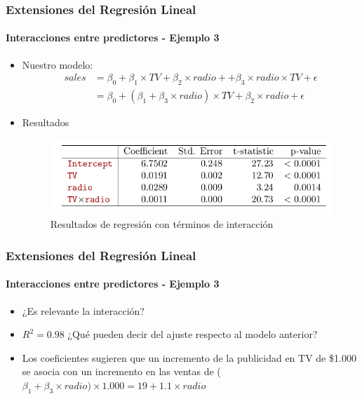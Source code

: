 \documentclass{beamer}
\begin{document}
\begin{frame}
\frametitle{Extensiones del Regresión Lineal}
\framesubtitle{Interacciones entre predictores - Ejemplo 3}
\begin{itemize}
	\item Nuestro modelo:
	\begin{equation}
	\begin{aligned}
	sales & = \beta_{0} + \beta_{1} \times TV + \beta_{2} \times radio + + \beta_{3} \times radio \times TV + \epsilon \\
	& =  \beta_{0} + (\beta_{1} + \beta_{3} \times  radio) \times  TV + \beta_{2}\times radio + \epsilon
	\end{aligned}
	\end{equation}
	\item Resultados
	
	\begin{figure}[h]
		\includegraphics[width=0.7\linewidth, height=0.25\textheight]{./img/table04}
		\caption{Resultados de regresión con términos de interacción\cite{hastie02}}
	\end{figure}
	
	\end{itemize}
\end{frame}


\begin{frame}
\frametitle{Extensiones del Regresión Lineal}
\framesubtitle{Interacciones entre predictores - Ejemplo 3}
\begin{itemize}
	\item ¿Es relevante la interacción?
	\item $R^2 = 0.98$ ¿Qué pueden decir del ajuste respecto al modelo anterior?
	\item Los coeficientes sugieren que un incremento de la publicidad en TV de \$1.000 se asocia con un incremento en las ventas de ($\beta_{1} + \beta_{3} \times radio) \times 1.000 = 19 + 1.1 \times radio$
\end{itemize}
\end{frame}
\end{document}
